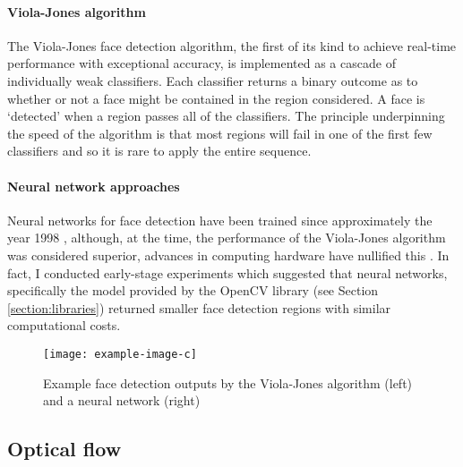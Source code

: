 \paragraph{Viola-Jones algorithm} 
The Viola-Jones face detection algorithm\cite{Viola2004}, the first of its kind to achieve real-time performance with exceptional accuracy, is implemented as a cascade of 
individually weak classifiers. Each classifier returns a binary outcome as to whether or not a face might be contained in the region considered.
A face is `detected' when a region passes all of the classifiers. The principle underpinning the speed of the algorithm is that most regions will fail in one of the first few classifiers
and so it is rare to apply the entire sequence.



\paragraph{Neural network approaches}
Neural networks for face detection have been trained since approximately the year 1998 \cite{655647}, although, at the time, the performance of the Viola-Jones algorithm was considered superior, 
advances in computing hardware have nullified this \cite{v-j-vs-ann}. In fact, I conducted early-stage experiments which suggested that neural networks, specifically the model provided by the OpenCV library (see 
Section \ref{section:libraries}) returned smaller face detection regions with similar computational costs.

\begin{figure}[H]
    \texttt{[image: example-image-c]}
   \caption{Example face detection outputs by the Viola-Jones algorithm (left) and a neural network (right) } 
   \label{fig:face_det_example}
\end{figure}

\subsection{Optical flow}

